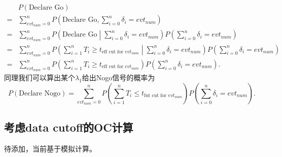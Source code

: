 \documentclass[a4paper,12pt]{article}
\begin{document}
\[
  \begin{aligned}
    & P\left(\text{Declare Go}\right)    \\
    =& \sum\limits_{evt_{num} = 0}^{n}P\left(
      \text{Declare Go}, \sum\limits_{i = 0}^n\delta_i = evt_{num}
    \right)    \\
    =& \sum\limits_{evt_{num} = 0}^{n}P\left(
      \text{Declare Go}\middle| \sum\limits_{i = 0}^n\delta_i = evt_{num}
    \right)
    P\left(\sum\limits_{i = 0}^n\delta_i = evt_{num}\right)    \\
    =& \sum\limits_{evt_{num} = 0}^{n}
    P\left(
      \sum\limits_{i = 1}^nT_i \geq t_{\text{eff cut for } evt_{num}}
      \middle| \sum\limits_{i = 0}^n\delta_i = evt_{num}
    \right)
    P\left(\sum\limits_{i = 0}^n\delta_i = evt_{num}\right)    \\
    =& \sum\limits_{evt_{num} = 0}^{n}
    P\left(
      \sum\limits_{i = 1}^nT_i \geq t_{\text{eff cut for } evt_{num}}
    \right)
    P\left(\sum\limits_{i = 0}^n\delta_i = evt_{num}\right)
    .
  \end{aligned}
\]
同理我们可以算出某个$\lambda_1$给出Nogo信号的概率为
\[
  P\left(\text{Declare Nogo}\right)
  = \sum\limits_{evt_{num} = 0}^{n}
    P\left(
      \sum\limits_{i = 1}^nT_i \leq t_{\text{fut cut for } evt_{num}}
    \right)
    P\left(\sum\limits_{i = 0}^n\delta_i = evt_{num}\right)
    .
\]

\subsection{考虑data cutoff的OC计算}
\label{sec:data-cutoffoc}

{\color{red}待添加，当前基于模拟计算。}





\clearpage
\appendix
\end{document}

